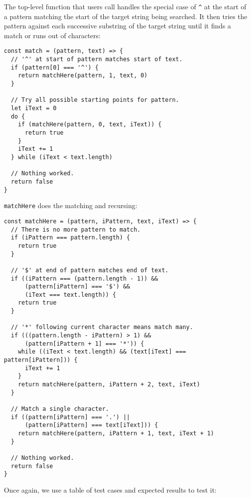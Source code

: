 \documentclass[krantzl]{krantz}
\begin{document}
The top-level function that users call
handles the special case of \texttt{{\textasciicircum}} at the start of a pattern
matching the start of the target string being searched.
It then tries the pattern against each successive substring of the target string
until it finds a match or runs out of characters:


\begin{lstlisting}[frame=single,frameround=tttt]
const match = (pattern, text) => {
  // '^' at start of pattern matches start of text.
  if (pattern[0] === '^') {
    return matchHere(pattern, 1, text, 0)
  }

  // Try all possible starting points for pattern.
  let iText = 0
  do {
    if (matchHere(pattern, 0, text, iText)) {
      return true
    }
    iText += 1
  } while (iText < text.length)

  // Nothing worked.
  return false
}
\end{lstlisting}



\texttt{matchHere} does the matching and recursing:


\begin{lstlisting}[frame=single,frameround=tttt]
const matchHere = (pattern, iPattern, text, iText) => {
  // There is no more pattern to match.
  if (iPattern === pattern.length) {
    return true
  }

  // '$' at end of pattern matches end of text.
  if ((iPattern === (pattern.length - 1)) &&
      (pattern[iPattern] === '$') &&
      (iText === text.length)) {
    return true
  }

  // '*' following current character means match many.
  if (((pattern.length - iPattern) > 1) &&
      (pattern[iPattern + 1] === '*')) {
    while ((iText < text.length) && (text[iText] === pattern[iPattern])) {
      iText += 1
    }
    return matchHere(pattern, iPattern + 2, text, iText)
  }

  // Match a single character.
  if ((pattern[iPattern] === '.') ||
      (pattern[iPattern] === text[iText])) {
    return matchHere(pattern, iPattern + 1, text, iText + 1)
  }

  // Nothing worked.
  return false
}
\end{lstlisting}



Once again,
we use a table of test cases and expected results to test it:
\end{document}
